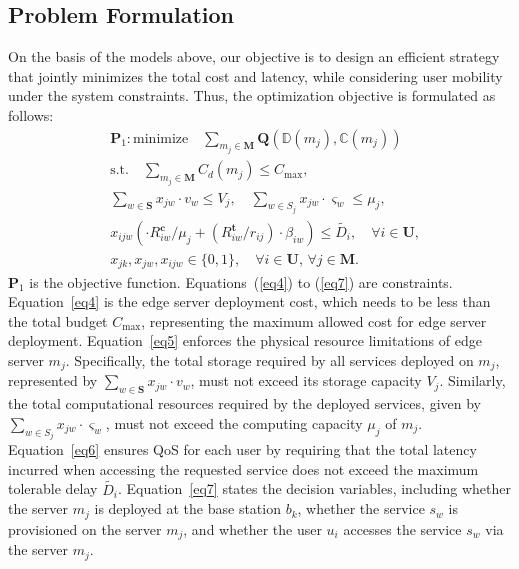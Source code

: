 \documentclass[10pt, conference, letterpaper]{IEEEtran}
\begin{document}
\subsection{Problem Formulation}
On the basis of the models above, our objective is to design an efficient strategy that jointly minimizes the total cost and latency, while considering user mobility under the system constraints. Thus, the optimization objective is formulated as follows: 
\begin{align}
	&\textbf{P}_1:\text{minimize} \quad \sum_{m_j\in \textbf{M}}\textbf{Q}(\mathbb{D}(m_j), \mathbb{C}(m_j))\label{eq3}\\
&\text{s.t.} \quad \sum_{m_j\in \textbf{M}} C_{d}(m_j) \leq C_{\max},\label{eq4}\\
& \sum_{w \in \textbf{S}} x_{jw}\cdot v_w \leq V_j, \quad \sum_{w \in S_j} x_{jw}\cdot \varsigma_{w} \leq \mu_j, \,\label{eq5} \\
& x_{ijw} (\cdot {R^{\textbf{c}}_{iw}}/{\mu_j} + ({R^{\textbf{t}}_{iw}}/{r_{ij}}) \cdot \beta_{iw}) \leq \widetilde{D_{i}}, \quad \forall i \in \textbf{U}, \label{eq6} \\
& x_{jk}, x_{jw}, x_{ijw} \in \{0, 1\}, \quad \forall i \in \textbf{U}, \, \forall j \in \textbf{M}.\label{eq7}
\end{align}  
$\textbf{P}_1$ is the objective function. Equations~(\ref{eq4}) to (\ref{eq7}) are constraints. Equation~\ref{eq4} is the edge server deployment cost, which needs to be less than the total budget $C_{\max}$, representing the maximum allowed cost for edge server deployment. Equation~\ref{eq5} enforces the physical resource limitations of edge server $m_j$. Specifically, the total storage required by all services deployed on $m_j$, represented by $\sum_{w \in \textbf{S}} x_{jw}\cdot v_w$, must not exceed its storage capacity $V_j$. Similarly, the total computational resources required by the deployed services, given by $\sum_{w\in S_j} x_{jw}\cdot \varsigma_{w}$, must not exceed the computing capacity $\mu_j$ of $m_j$. Equation~\ref{eq6} ensures QoS for each user by requiring that the total latency incurred when accessing the requested service does not exceed the maximum tolerable delay $\widetilde{D_i}$. Equation~\ref{eq7} states the decision variables, including whether the server $m_j$ is deployed at the base station $b_k$, whether the service $s_w$ is provisioned on the server $m_j$, and whether the user $u_i$ accesses the service $s_w$ via the server $m_j$. 
\end{document}
